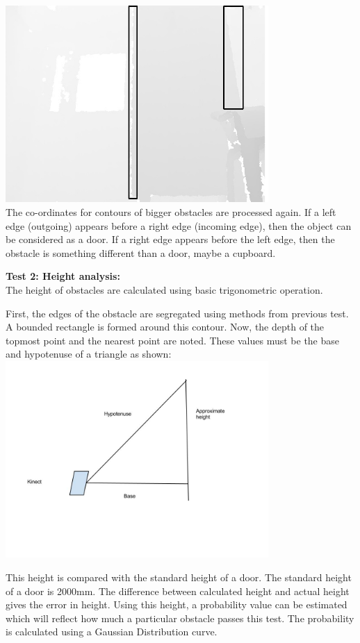\documentclass{report}
\begin{document}
\includegraphics[width = 10cm]{result.jpg} \\

The co-ordinates for contours of bigger obstacles are processed again. If a left edge (outgoing) 
appears before a right edge (incoming edge), then the object can be considered as a door. If a right 
edge appears  before the left edge, then the obstacle is something different than a door, maybe a
cupboard.

\textbf{Test 2: Height analysis:} \\
The height of obstacles are calculated using basic trigonometric operation.

First, the edges of the obstacle are segregated using methods from previous test. 
A bounded rectangle is formed around this contour. Now, the depth of the topmost point and the nearest 
point are noted. These values must be the base and hypotenuse of a triangle as shown: \\

\includegraphics[width = 10cm]{pythagoras.jpg}

This height is compared with the standard height of a door. The standard height of a door is 2000mm. 
The difference between calculated height and actual height gives the error in height. Using this height, 
a probability value can be estimated which will reflect how much a particular obstacle passes this test. 
The probability is calculated using a Gaussian Distribution curve. \\
\pagebreak
\end{document}
